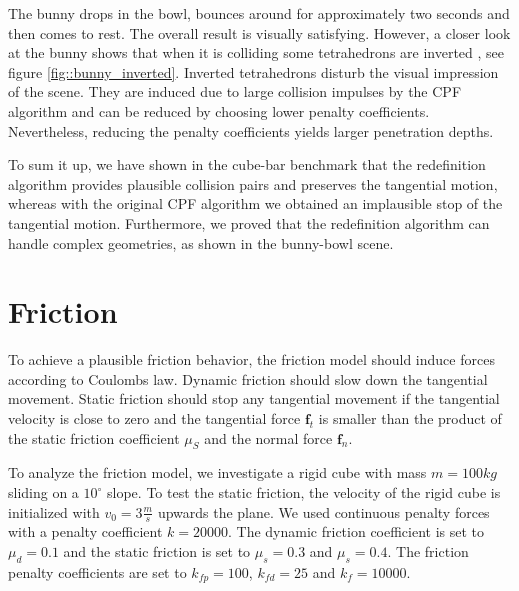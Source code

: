 The bunny drops in the bowl, bounces around for approximately two seconds and then comes to rest. The overall result is visually satisfying. However, a closer look at the bunny shows that when it is colliding some tetrahedrons are inverted , see figure \ref{fig::bunny_inverted}. Inverted tetrahedrons disturb the visual impression of the scene. They are induced due to large collision impulses by the CPF algorithm and can be reduced by choosing lower penalty coefficients. Nevertheless, reducing the penalty coefficients yields larger penetration depths.
\newpage

To sum it up, we have shown in the cube-bar benchmark that the redefinition algorithm provides plausible collision pairs and preserves the tangential motion, whereas with the original CPF algorithm we obtained an implausible stop of the tangential motion. Furthermore, we proved that the redefinition algorithm can handle complex geometries, as shown in the bunny-bowl scene.

\section{Friction}
To achieve a plausible friction behavior, the friction model should induce forces according to Coulombs law. Dynamic friction should slow down the tangential movement. Static friction should stop any tangential movement if the tangential velocity is close to zero and the tangential force $\mathbf f_t$ is smaller than the product of the static friction coefficient $\mu_S $ and the normal force $\mathbf f_n$.


To analyze the friction model, we investigate a rigid cube with mass $m=100kg$ sliding on a $10^\circ$ slope. To test the static friction, the velocity of the rigid cube is initialized with $v_0=3\frac{m}{s}$ upwards the plane. We used continuous penalty forces with a penalty coefficient $k=20000$. The dynamic friction coefficient is set to $\mu_d=0.1$ and the static friction is set to $\mu_s=0.3$ and $\mu_s=0.4$. The friction penalty coefficients are set to $k_{fp}=100$, $k_{fd}=25$ and $k_f=10000$.

